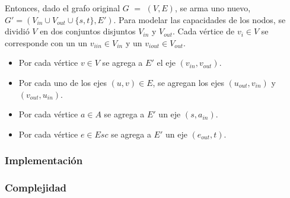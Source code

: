 Entonces, dado el grafo original $G$ $=$ $(V,E)$, se arma uno nuevo, $G' = (V_{in} \cup V_{out} \cup \{s,t\}, E')$. Para modelar las capacidades de los nodos, se dividió $V$ en dos conjuntos disjuntos $V_{in}$ y $V_{out}$. Cada vértice de $v_i \in V$ se corresponde con un un $v_{iin} \in V_{in}$ y un $v_{iout} \in V_{out}$. 

\begin{itemize}
\item Por cada vértice $v \in V$ se agrega a $E'$ el eje $(v_{in},v_{out})$.
\item Por cada uno de los ejes $(u,v) \in E$, se agregan los ejes $(u_{out}, v_{in})$ y $(v_{out}, u_{in})$.
\item Por cada vértice $a \in A$ se agrega a $E'$ un eje $(s,a_{in})$.
\item Por cada vértice $e \in Esc$ se agrega a $E'$ un eje $(e_{out},t)$.
\end{itemize}



\subsubsection{Implementación}
\subsubsection{Complejidad}
